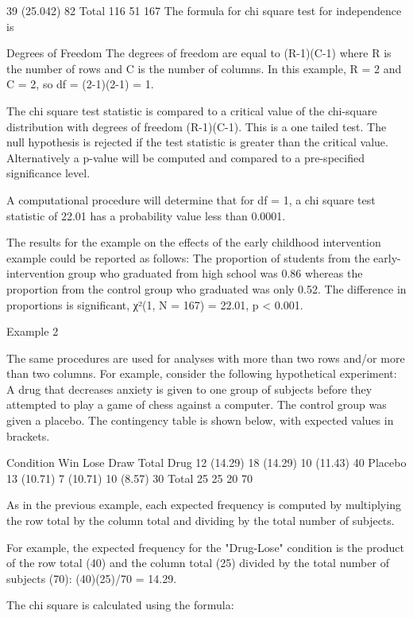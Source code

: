 \begin{frame}
39
(25.042)
82
Total
116
51
167
The formula for chi square test for independence is 
 
 
 
Degrees of Freedom 
The degrees of freedom are equal to (R-1)(C-1) where R is the number of rows and C is the number of columns. In this example, R = 2 and C = 2, so df = (2-1)(2-1) = 1.
 
The chi square test statistic is compared to a critical value of the chi-square distribution with degrees of freedom (R-1)(C-1). This is a one tailed test. The null hypothesis is rejected if the test statistic is greater than the critical value. Alternatively a p-value will be computed and compared to a pre-specified significance level.
 
A computational procedure will determine that for df = 1, a chi square test statistic of 22.01 has a probability value less than 0.0001.
 
 
The results for the example on the effects of the early childhood intervention example could be reported as follows:
The proportion of students from the early-intervention group who graduated from high school was 0.86 whereas the proportion from the control group who graduated was only 0.52. The difference in proportions is significant, χ²(1, N = 167) = 22.01, p < 0.001.
 
Example 2 
 
The same procedures are used for analyses with more than two rows and/or more than two columns. For example, consider the following hypothetical experiment: A drug that decreases anxiety is given to one group of subjects before they attempted to play a game of chess against a computer. The control group was given a placebo. The contingency table is shown below, with expected values in brackets.
 
Condition
Win
Lose
Draw
Total
Drug
12
(14.29)
18
(14.29)
10
(11.43)
40
Placebo
13
(10.71)
7
(10.71)
10
(8.57)
30
Total
25
25
20
70
 
As in the previous example, each expected frequency is computed by multiplying the row total by the column total and dividing by the total number of subjects.
 
For example, the expected frequency for the "Drug-Lose" condition is the product of the row total (40) and the column total (25) divided by the total number of subjects (70): (40)(25)/70 = 14.29. 
 
 
The chi square is calculated using the formula:
 
 
 

\end{frame}
